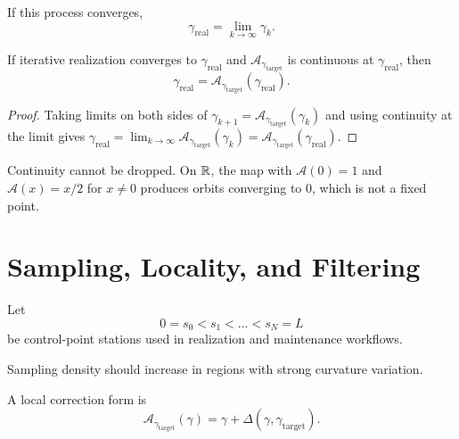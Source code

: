 \begin{definition}
\label{def:realized-alignment-limit}
If this process converges,
\[
\gamma_{\mathrm{real}}=\lim_{k\to\infty}\gamma_k.
\]
\end{definition}

\begin{proposition}
\label{prop:realization-fixed-point}
If iterative realization converges to \(\gamma_{\mathrm{real}}\) and
\(\mathcal A_{\gamma_{\mathrm{target}}}\) is continuous at
\(\gamma_{\mathrm{real}}\), then
\[
\gamma_{\mathrm{real}}=
\mathcal A_{\gamma_{\mathrm{target}}}(\gamma_{\mathrm{real}}).
\]
\end{proposition}

\begin{proof}
Taking limits on both sides of
\(\gamma_{k+1}=\mathcal A_{\gamma_{\mathrm{target}}}(\gamma_k)\) and using
continuity at the limit gives
\(\gamma_{\mathrm{real}}
=\lim_{k\to\infty}\mathcal A_{\gamma_{\mathrm{target}}}(\gamma_k)
=\mathcal A_{\gamma_{\mathrm{target}}}(\gamma_{\mathrm{real}})\).
\end{proof}

Continuity cannot be dropped. On \(\mathbb{R}\), the map with
\(\mathcal A(0)=1\) and \(\mathcal A(x)=x/2\) for \(x\neq0\) produces
orbits converging to \(0\), which is not a fixed point.

\section{Sampling, Locality, and Filtering}

\begin{definition}
\label{def:control-points}
Let
\[
0=s_0<s_1<\dots<s_N=L
\]
be control-point stations used in realization and maintenance workflows.
\end{definition}

\begin{proposition}
\label{prop:adaptive-sampling-principle}
Sampling density should increase in regions with strong curvature
variation.
\end{proposition}

\begin{definition}
\label{def:local-correction}
A local correction form is
\[
\mathcal A_{\gamma_{\mathrm{target}}}(\gamma)
=
\gamma+\Delta(\gamma,\gamma_{\mathrm{target}}).
\]
\end{definition}

